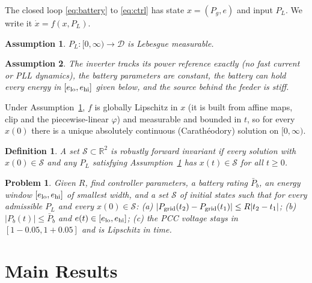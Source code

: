 \documentclass[journal]{IEEEtran}
\newtheorem{assumption}{Assumption}
\newtheorem{definition}{Definition}
\newtheorem{problem}{Problem}
\theoremstyle{remark}
\newcommand{\Pbar}{\bar P_b}
\newcommand{\D}{\mathcal{D}}
\newcommand{\Sset}{\mathcal{S}}
\begin{document}
The closed loop \eqref{eq:battery} to \eqref{eq:ctrl} has state $x=(P_g,e)$ and input $P_L$. We write it
$\dot x=f(x,P_L)$.

\begin{assumption}\label{ass:load}
$P_L:[0,\infty)\to\D$ is Lebesgue measurable.
\end{assumption}

\begin{assumption}\label{ass:hw}
The inverter tracks its power reference exactly (no fast current or PLL dynamics), the battery parameters are
constant, the battery can hold every energy in $[e_{\rm lo},e_{\rm hi}]$ given below, and the source behind the
feeder is stiff.
\end{assumption}

Under Assumption~\ref{ass:load}, $f$ is globally Lipschitz in $x$ (it is built from affine maps, clip and the
piecewise-linear $\varphi$) and measurable and bounded in $t$, so for every $x(0)$ there is a unique absolutely
continuous (Carath\'eodory) solution on $[0,\infty)$.

\begin{definition}
A set $\Sset\subset\mathbb{R}^2$ is \emph{robustly forward invariant} if every solution with $x(0)\in\Sset$ and
any $P_L$ satisfying Assumption~\ref{ass:load} has $x(t)\in\Sset$ for all $t\ge 0$.
\end{definition}

\begin{problem}
Given $R$, find controller parameters, a battery rating $\Pbar$, an energy window $[e_{\rm lo},e_{\rm hi}]$ of
smallest width, and a set $\Sset$ of initial states such that for every admissible $P_L$ and every $x(0)\in\Sset$:
(a) $|P_{\rm grid}(t_2)-P_{\rm grid}(t_1)|\le R|t_2-t_1|$; (b) $|P_b(t)|\le\Pbar$ and $e(t)\in[e_{\rm lo},e_{\rm hi}]$;
(c) the PCC voltage stays in $[1-0.05,1+0.05]$ and is Lipschitz in time.
\end{problem}

\section{Main Results}\label{sec:theory}
\end{document}
